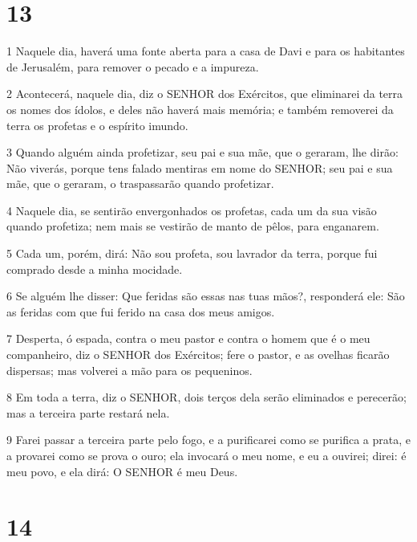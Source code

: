 \chapter{13}

\par 1 Naquele dia, haverá uma fonte aberta para a casa de Davi e para os habitantes de Jerusalém, para remover o pecado e a impureza.
\par 2 Acontecerá, naquele dia, diz o SENHOR dos Exércitos, que eliminarei da terra os nomes dos ídolos, e deles não haverá mais memória; e também removerei da terra os profetas e o espírito imundo.
\par 3 Quando alguém ainda profetizar, seu pai e sua mãe, que o geraram, lhe dirão: Não viverás, porque tens falado mentiras em nome do SENHOR; seu pai e sua mãe, que o geraram, o traspassarão quando profetizar.
\par 4 Naquele dia, se sentirão envergonhados os profetas, cada um da sua visão quando profetiza; nem mais se vestirão de manto de pêlos, para enganarem.
\par 5 Cada um, porém, dirá: Não sou profeta, sou lavrador da terra, porque fui comprado desde a minha mocidade.
\par 6 Se alguém lhe disser: Que feridas são essas nas tuas mãos?, responderá ele: São as feridas com que fui ferido na casa dos meus amigos.
\par 7 Desperta, ó espada, contra o meu pastor e contra o homem que é o meu companheiro, diz o SENHOR dos Exércitos; fere o pastor, e as ovelhas ficarão dispersas; mas volverei a mão para os pequeninos.
\par 8 Em toda a terra, diz o SENHOR, dois terços dela serão eliminados e perecerão; mas a terceira parte restará nela.
\par 9 Farei passar a terceira parte pelo fogo, e a purificarei como se purifica a prata, e a provarei como se prova o ouro; ela invocará o meu nome, e eu a ouvirei; direi: é meu povo, e ela dirá: O SENHOR é meu Deus.

\chapter{14}


